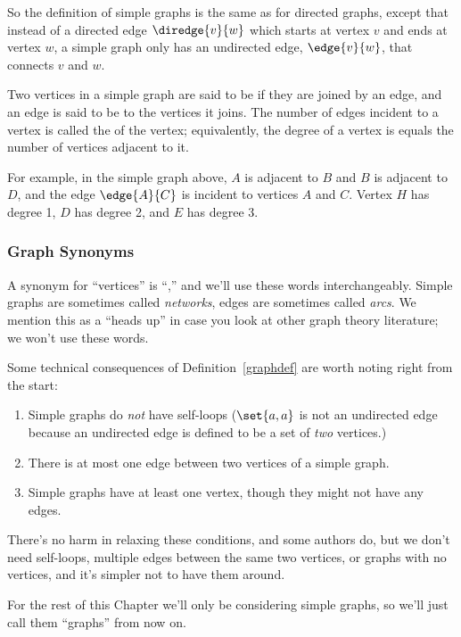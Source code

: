 So the definition of simple graphs is the same as for directed graphs,
except that instead of a directed edge $\diredge{v}{w}$ which starts
at vertex $v$ and ends at vertex $w$, a simple graph only has an
undirected edge, $\edge{v}{w}$, that connects $v$ and $w$.

\begin{definition}
Two vertices in a simple graph are said to be  if they are
joined by an edge, and an edge is said to be  to the
vertices it joins.  The number of edges incident to a vertex is called the
 of the vertex; equivalently, the degree of a vertex is
equals the number of vertices adjacent to it.
\end{definition}
For example, in the simple graph above, $A$ is adjacent to $B$ and $B$ is
adjacent to $D$, and the edge $\edge{A}{C}$ is incident to vertices $A$
and $C$.  Vertex $H$ has degree 1, $D$ has degree 2, and $E$ has degree 3.

\subsubsection{Graph Synonyms}
A synonym for ``vertices'' is ``,'' and we'll use these
words interchangeably.  Simple graphs are sometimes
called \emph{networks}, edges are sometimes called \emph{arcs}.  We
mention this as a ``heads up'' in case you look at other graph theory
literature; we won't use these words.

Some technical consequences of Definition~\ref{graphdef} are worth noting
right from the start:
\begin{enumerate}
\item Simple graphs do \emph{not} have self-loops ($\set{a,a}$ is not an undirected edge because an undirected edge is defined to be a set of \emph{two} vertices.)

\item There is at most one edge between two vertices of a simple graph.

\item Simple graphs have at least one vertex, though they might not have
any edges.
\end{enumerate}
There's no harm in relaxing these conditions, and some authors do, but we don't need
self-loops, multiple edges between the same two vertices, or graphs with no vertices,
and it's simpler not to have them around.

For the rest of this Chapter we'll only be considering simple graphs, so we'll just
call them ``graphs'' from now on.

